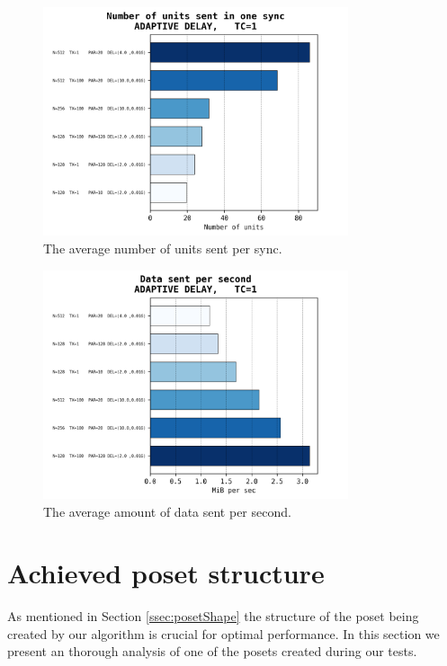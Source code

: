 \documentclass[a4paper,10pt]{article}
\begin{document}
			\begin{figure}[h]
				\centering
				\includegraphics[width=0.8\textwidth]{bar_plots/big/units_sent_sync.png}
				\caption{The average number of units sent per sync.}
				\label{fig:bigUnitsPerSync}
			\end{figure}
			\begin{figure}[h]
				\centering
				\includegraphics[width=0.8\textwidth]{bar_plots/big/bytes_sent_per_sec.png}
				\caption{The average amount of data sent per second.}
				\label{fig:bigBps}
			\end{figure}
	\FloatBarrier
	\section{Achieved poset structure}
	\label{sec:structure}
	\FloatBarrier
	 As mentioned in Section \ref{ssec:posetShape} the structure of the poset being created by our algorithm is crucial for optimal performance.
		In this section we present an thorough analysis of one of the posets created during our tests.
\end{document}
